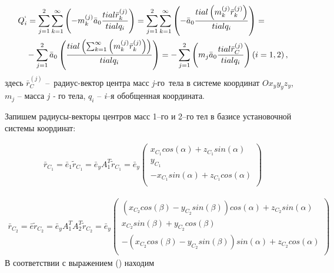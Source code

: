 \begin{equation} %
\label{eq:p3:29}
\begin{multlined}
Q_{i}^{`}= 
\sum _{j=1}^{2} \sum _{k=1}^{\infty} \left( -m_{k}^{ \left( j \right) }\bar{a}_{0} \frac{ tial \bar{r}_{k}^{ \left( j \right) }}{ tial q_{i}} \right) = 
\sum _{j=1}^{2} \sum _{k=1}^{\infty} \left( -\bar{a}_{0} \frac{ tial \left( m_{k}^{ \left( j \right) }\bar{r}_{k}^{ \left( j \right) } \right) }{ tial q_{i}} \right) = \\
- \sum _{j=1}^{2}\bar{a}_{0} \left( \frac{ tial \left( \sum _{k=1}^{\infty} \left( m_{k}^{ \left( j \right) }\bar{r}_{k}^{ \left( j \right) } \right) \right) }{ tial q_{i}} \right) =
- \sum _{j=1}^{2} \left( m_{j}\bar{a}_{0} \frac{ tial \bar{r}_{C}^{ \left( j \right) }}{ tial q_{i}} \right) \left( i=1,2 \right),
\end{multlined}
\end{equation}
здесь \( \bar{r}_{C}^{ \left( j \right) } \) –\ радиус-вектор центра масс \textit{j-}го\ тела в системе координат \( Ox_{y}y_{y}z_{y} \), \( m_{j} \) – масса \textit{j - }го тела, \( q_{i} \) – \textit{i}–я обобщенная координата. 

Запишем радиусы-векторы центров масс 1–го и 2–го тел в базисе установочной системы координат: 


\begin{equation} %
\label{eq:p3:30}
\begin{multlined}
\bar{r}_{C_{1}}=\bar{e}_{1}\tilde{r}_{C_{1}}=\bar{e}_{y}A_{1}^{T}\tilde{r}_{C_{1}}=\bar{e}_{y} \left( \begin{matrix}
x_{C_{1}}cos \left( \alpha \right) +z_{C_{1}}sin \left( \alpha \right) \\
y_{C_{1}}\\
-x_{C_{1}}sin \left( \alpha \right) +z_{C_{1}}cos \left( \alpha \right) \\
\end{matrix}
\right) 
\end{multlined}
\end{equation}

\begin{equation} %
\label{eq:p3:31}
\begin{multlined}
\bar{r}_{C_{2}}=\bar{e}\tilde{r}_{C_{2}}=\bar{e}_{y}A_{1}^{T}A_{2}^{T}\tilde{r}_{C_{2}}=\bar{e}_{y} \left( \begin{matrix}
\left( x_{C_{2}}cos \left( \beta \right) -y_{C_{2}}sin \left( \beta \right) \right) cos \left( \alpha \right) +z_{C_{2}}sin \left( \alpha \right) \\
x_{C_{2}}sin \left( \beta \right) +y_{C_{2}}cos \left( \beta \right) \\
- \left( x_{C_{2}}cos \left( \beta \right) -y_{C_{2}}sin \left( \beta \right) \right) sin \left( \alpha \right) +z_{C_{2}}cos \left( \alpha \right) \\
\end{matrix}
\right) 
\end{multlined}
\end{equation}
В соответствии с выражением () находим


